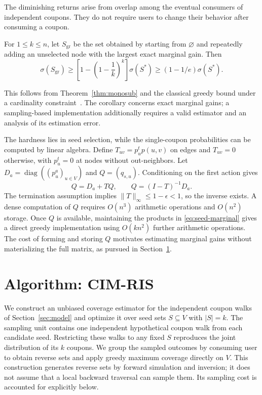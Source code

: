 \documentclass[sigconf]{acmart}
\newcommand{\CIMRIS}{\textsc{CIM-RIS}}
\begin{document}
The diminishing returns arise from overlap among the eventual
consumers of independent coupons. They do not require users to change
their behavior after consuming a coupon.

\begin{corollary}
\label{cor:exact-greedy}
For $1\leq k\leq n$, let $S_{\mathrm{gr}}$ be the set obtained by
starting from $\varnothing$ and repeatedly adding an unselected node
with the largest exact marginal gain. Then
\[
  \sigma(S_{\mathrm{gr}})
    \geq\left[1-\left(1-\frac{1}{k}\right)^k\right]\sigma(S^*)
    \geq(1-1/e)\sigma(S^*).
\]
\end{corollary}

This follows from Theorem~\ref{thm:monosub} and the classical greedy
bound under a cardinality constraint~\cite{nemhauser1978analysis}.
The corollary concerns exact marginal gains; a sampling-based
implementation additionally requires a valid estimator and an analysis
of its estimation error.

The hardness lies in seed selection, while the single-coupon
probabilities can be computed by linear algebra. Define
$T_{uv}=p_u^t p(u,v)$ on edges and $T_{uv}=0$ otherwise, with
$p_u^t=0$ at nodes without out-neighbors. Let
$D_a=\operatorname{diag}((p_u^a)_{u\in V})$ and $Q=(q_{s,u})$.
Conditioning on the first action gives
\begin{equation}
\label{eq:single-coupon-kernel}
  Q=D_a+TQ,\qquad Q=(I-T)^{-1}D_a.
\end{equation}
The termination assumption implies $\|T\|_\infty\leq1-\epsilon<1$,
so the inverse exists. A dense computation of $Q$ requires $O(n^3)$
arithmetic operations and $O(n^2)$ storage. Once $Q$ is available,
maintaining the products in \eqref{eq:seed-marginal} gives a direct
greedy implementation using $O(kn^2)$ further arithmetic operations.
The cost of forming and storing $Q$ motivates estimating marginal
gains without materializing the full matrix, as pursued in
Section~\ref{sec:algo}.

\section{Algorithm: \CIMRIS{}}
\label{sec:algo}

We construct an unbiased coverage estimator for the independent coupon
walks of Section~\ref{sec:model} and optimize it over seed sets
$S\subseteq V$ with $|S|=k$. The sampling unit contains one independent
hypothetical coupon walk from each candidate seed. Restricting these
walks to any fixed $S$ reproduces the joint distribution of its $k$
coupons. We group the sampled outcomes by consuming user to obtain
reverse sets and apply greedy maximum coverage directly on $V$.
This construction generates reverse sets by forward simulation and
inversion; it does not assume that a local backward traversal can
sample them. Its sampling cost is accounted for explicitly below.
\end{document}
